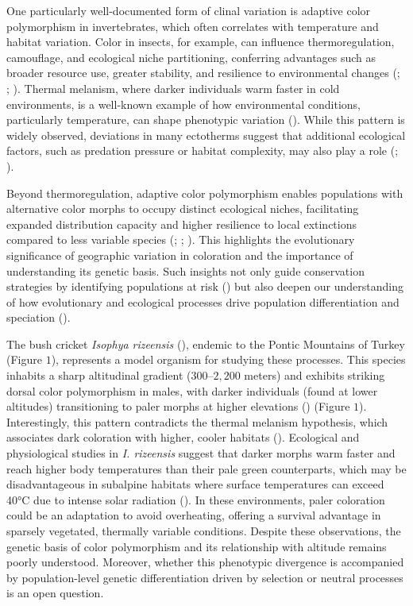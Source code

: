 \documentclass[9pt,a4paper,twoside]{rho-class/rho}
\begin{document}
    One particularly well-documented form of clinal variation is adaptive color polymorphism in invertebrates, which often correlates with temperature and habitat variation. Color in insects, for example, can influence thermoregulation, camouflage, and ecological niche partitioning, conferring advantages such as broader resource use, greater stability, and resilience to environmental changes (\cite{Forsman2008}; \cite{Zeuss2014}; \cite{Kozlov2022}). Thermal melanism, where darker individuals warm faster in cold environments, is a well-known example of how environmental conditions, particularly temperature, can shape phenotypic variation (\cite{Clusella-Trullas2020}). While this pattern is widely observed, deviations in many ectotherms suggest that additional ecological factors, such as predation pressure or habitat complexity, may also play a role (\cite{Karlsson2008}; \cite{Goodman2021}).
    
    Beyond thermoregulation, adaptive color polymorphism enables populations with alternative color morphs to occupy distinct ecological niches, facilitating expanded distribution capacity and higher resilience to local extinctions compared to less variable species (\cite{Forsman2008}; \cite{Wennersten2009}; \cite{Kozlov2022}). This highlights the evolutionary significance of geographic variation in coloration and the importance of understanding its genetic basis. Such insights not only guide conservation strategies by identifying populations at risk (\cite{Forsman2016}) but also deepen our understanding of how evolutionary and ecological processes drive population differentiation and speciation (\cite{McLean2014}).
    
    The bush cricket \textit{Isophya rizeensis} (\cite{SEVGILI2003}), endemic to the Pontic Mountains of Turkey (Figure $1$), represents a model organism for studying these processes. This species inhabits a sharp altitudinal gradient ($300$–$2,200$ meters) and exhibits striking dorsal color polymorphism in males, with darker individuals (found at lower altitudes) transitioning to paler morphs at higher elevations (\cite{Çağlar2014}) (Figure $1$). Interestingly, this pattern contradicts the thermal melanism hypothesis, which associates dark coloration with higher, cooler habitats (\cite{CLUSELLATRULLAS2007}). Ecological and physiological studies in \textit{I. rizeensis} suggest that darker morphs warm faster and reach higher body temperatures than their pale green counterparts, which may be disadvantageous in subalpine habitats where surface temperatures can exceed 40°C due to intense solar radiation (\cite{Kuyucu2016}). In these environments, paler coloration could be an adaptation to avoid overheating, offering a survival advantage in sparsely vegetated, thermally variable conditions. Despite these observations, the genetic basis of color polymorphism and its relationship with altitude remains poorly understood. Moreover, whether this phenotypic divergence is accompanied by population-level genetic differentiation driven by selection or neutral processes is an open question.
    
\end{document}
